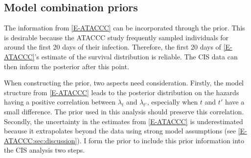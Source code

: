 \documentclass[thesis.tex]{subfiles}
\begin{document}
\subsection{Model combination priors} \label{perf-test:sec:informative-priors}

The information from \cref{E-ATACCC} can be incorporated through the prior.
This is desirable because the ATACCC study frequently sampled individuals for around the first 20 days of their infection.
Therefore, the first 20 days of \cref{E-ATACCC}'s estimate of the survival distribution is reliable.
The CIS data can then inform the posterior after this point.

When constructing the prior, two aspects need consideration.
Firstly, the model structure from \cref{E-ATACCC} leads to the posterior distribution on the hazards having a positive correlation between $\lambda_t$ and $\lambda_{t'}$, especially when $t$ and $t'$ have a small difference.
The prior used in this analysis should preserve this correlation.
Secondly, the uncertainty in the estimates from \cref{E-ATACCC} is underestimated because it extrapolates beyond the data using strong model assumptions (see \cref{E-ATACCC:sec:discussion}).
I form the prior to include this prior information into the CIS analysis two steps.
\end{document}
